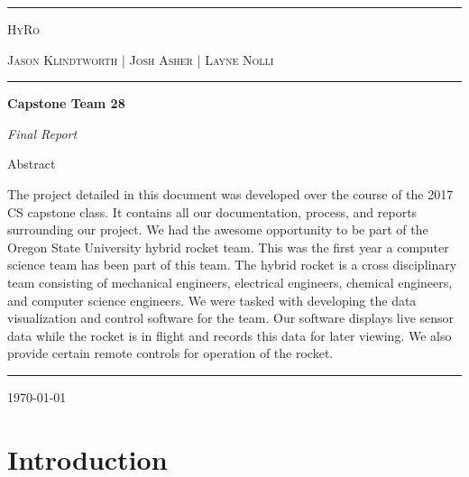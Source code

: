 \documentclass[10pt,draftclsnofoot,onecolumn,retainorgcmds]{IEEEtran}
\newcommand{\NHRule}{\rule{\linewidth}{0.5mm}} %
\begin{document}
\begin{titlepage}
	\centering	
	\NHRule
	\vspace{1cm}
	{\scshape\LARGE HyRo \par}
	\vspace{1cm}
	{\scshape\Large Jason Klindtworth  |  Josh Asher  |   Layne Nolli\par}
	\vspace{1.5cm}
	\NHRule
	\vspace{1cm}
	{\huge\bfseries Capstone Team 28\par}
	\vspace{2cm}
	{\Large\itshape Final Report\par}
	\vspace{1cm}
	\vspace{1cm}
	{\large Abstract\par}
	\vspace{1cm}
	The project detailed in this document was developed over the course of the 2017 CS capstone class. It contains all our documentation, process, and reports surrounding our project. We had the awesome opportunity to be part of the Oregon State University hybrid rocket team. This was the first year a computer science team has been part of this team. The hybrid rocket is a cross disciplinary team consisting of mechanical engineers, electrical engineers, chemical engineers, and computer science engineers. We were tasked with developing the data visualization and control software for the team. Our software displays live sensor data while the rocket is in flight and records this data for later viewing. We also provide certain remote controls for operation of the rocket. \par
	\NHRule
	\vfill

	{\large \today\par}
\end{titlepage}
\tableofcontents
\newpage

\section{Introduction}
\end{document}
